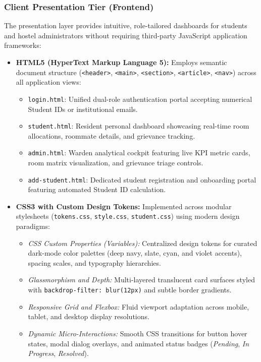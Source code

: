 \documentclass[12pt,a4paper]{article}
\begin{document}
\subsubsection{Client Presentation Tier (Frontend)}
The presentation layer provides intuitive, role-tailored dashboards for students and hostel administrators without requiring third-party JavaScript application frameworks:
\begin{itemize}
    \item \textbf{HTML5 (HyperText Markup Language 5):} Employs semantic document structure (\texttt{<header>}, \texttt{<main>}, \texttt{<section>}, \texttt{<article>}, \texttt{<nav>}) across all application views:
    \begin{itemize}
        \item \texttt{login.html}: Unified dual-role authentication portal accepting numerical Student IDs or institutional emails.
        \item \texttt{student.html}: Resident personal dashboard showcasing real-time room allocations, roommate details, and grievance tracking.
        \item \texttt{admin.html}: Warden analytical cockpit featuring live KPI metric cards, room matrix visualization, and grievance triage controls.
        \item \texttt{add-student.html}: Dedicated student registration and onboarding portal featuring automated Student ID calculation.
    \end{itemize}
    \item \textbf{CSS3 with Custom Design Tokens:} Implemented across modular stylesheets (\texttt{tokens.css}, \texttt{style.css}, \texttt{student.css}) using modern design paradigms:
    \begin{itemize}
        \item \textit{CSS Custom Properties (Variables):} Centralized design tokens for curated dark-mode color palettes (deep navy, slate, cyan, and violet accents), spacing scales, and typography hierarchies.
        \item \textit{Glassmorphism and Depth:} Multi-layered translucent card surfaces styled with \texttt{backdrop-filter: blur(12px)} and subtle border gradients.
        \item \textit{Responsive Grid and Flexbox:} Fluid viewport adaptation across mobile, tablet, and desktop display resolutions.
        \item \textit{Dynamic Micro-Interactions:} Smooth CSS transitions for button hover states, modal dialog overlays, and animated status badges (\textit{Pending}, \textit{In Progress}, \textit{Resolved}).

\end{itemize}
\end{itemize}
\end{document}
